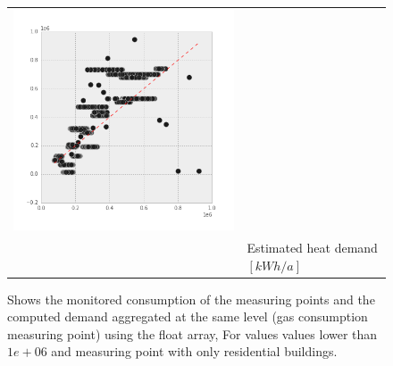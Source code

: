 \begin{figure}[htb]
\begin{tabular}{lccc}
 \includegraphics[width= 0.28\linewidth]{FIGURES/EcoFYS-R_06}\\
&\multicolumn{3}{l}{Estimated heat demand $[kWh/a]$}\\

\end{tabular}	
	\caption[consumption vs. demand with flooat array (residential buildings)]
	{Shows the monitored consumption of the measuring points
	and the computed demand aggregated at the same level 
	(gas consumption measuring point) using the float array, 
	For values values lower than $1e+06$ and measuring point with only
    residential buildings.}
    \label{fig:con_dem_Residential}
\end{figure}